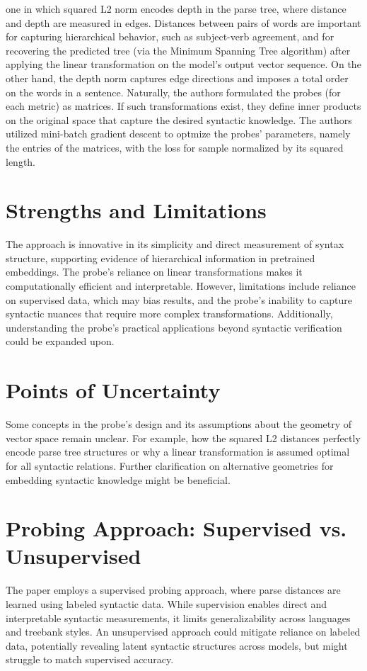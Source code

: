 \documentclass[11pt]{article}
\begin{document}
one in which squared L2 norm encodes depth in the parse tree, 
where distance and depth are measured in edges. Distances between pairs of words
are important for capturing hierarchical behavior, such as subject-verb agreement, and for recovering 
the predicted tree (via the Minimum Spanning Tree algorithm) after applying the linear transformation 
on the model's output vector sequence. On the other hand, the
depth norm captures edge directions and imposes a total order on the words in a sentence.
Naturally, the authors formulated the probes (for each metric) as matrices.
If such transformations exist, they define inner products on the
original space that capture the desired syntactic knowledge. 
The authors utilized mini-batch gradient descent to optmize the probes'
parameters, namely the entries of the matrices, with the loss for sample normalized by its squared length.


\section*{Strengths and Limitations}
The approach is innovative in its simplicity and direct measurement of syntax structure, supporting evidence of hierarchical information in pretrained embeddings. The probe’s reliance on linear transformations makes it computationally efficient and interpretable. However, limitations include reliance on supervised data, which may bias results, and the probe's inability to capture syntactic nuances that require more complex transformations. Additionally, understanding the probe's practical applications beyond syntactic verification could be expanded upon.

\section*{Points of Uncertainty}
Some concepts in the probe's design and its assumptions about the geometry of vector space remain unclear. For example, how the squared L2 distances perfectly encode parse tree structures or why a linear transformation is assumed optimal for all syntactic relations. Further clarification on alternative geometries for embedding syntactic knowledge might be beneficial.

\section*{Probing Approach: Supervised vs. Unsupervised}
The paper employs a supervised probing approach, where parse distances are learned using labeled syntactic data. While supervision enables direct and interpretable syntactic measurements, it limits generalizability across languages and treebank styles. An unsupervised approach could mitigate reliance on labeled data, potentially revealing latent syntactic structures across models, but might struggle to match supervised accuracy.
\end{document}
